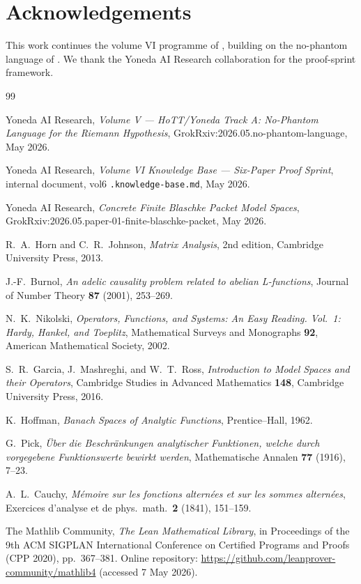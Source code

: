 \documentclass[12pt]{article}
\theoremstyle{definition}
\theoremstyle{remark}
\begin{document}
\section*{Acknowledgements}

This work continues the volume VI programme of \cite{Vol6KB}, building on
the no-phantom language of \cite{Vol5KB}. We thank the Yoneda AI Research
collaboration for the proof-sprint framework.

\begin{thebibliography}{99}

Yoneda AI Research, \emph{Volume V — HoTT/Yoneda Track A: No-Phantom Language for the Riemann Hypothesis}, GrokRxiv:2026.05.no-phantom-language, May 2026.

Yoneda AI Research, \emph{Volume VI Knowledge Base — Six-Paper Proof Sprint}, internal document, vol6 \texttt{.knowledge-base.md}, May 2026.

Yoneda AI Research, \emph{Concrete Finite Blaschke Packet Model Spaces}, GrokRxiv:2026.05.paper-01-finite-blaschke-packet, May 2026.

R.~A.~Horn and C.~R.~Johnson, \emph{Matrix Analysis}, 2nd edition, Cambridge University Press, 2013.

J.-F.~Burnol, \emph{An adelic causality problem related to abelian L-functions}, Journal of Number Theory \textbf{87} (2001), 253--269.

N.~K.~Nikolski, \emph{Operators, Functions, and Systems: An Easy Reading. Vol.~1: Hardy, Hankel, and Toeplitz}, Mathematical Surveys and Monographs \textbf{92}, American Mathematical Society, 2002.

S.~R.~Garcia, J.~Mashreghi, and W.~T.~Ross, \emph{Introduction to Model Spaces and their Operators}, Cambridge Studies in Advanced Mathematics \textbf{148}, Cambridge University Press, 2016.

K.~Hoffman, \emph{Banach Spaces of Analytic Functions}, Prentice--Hall, 1962.

G.~Pick, \emph{\"Uber die Beschr\"ankungen analytischer Funktionen, welche durch vorgegebene Funktionswerte bewirkt werden}, Mathematische Annalen \textbf{77} (1916), 7--23.

A.~L.~Cauchy, \emph{M\'emoire sur les fonctions altern\'ees et sur les sommes altern\'ees}, Exercices d'analyse et de phys.~math.~\textbf{2} (1841), 151--159.

The Mathlib Community, \emph{The Lean Mathematical Library}, in Proceedings of the 9th ACM SIGPLAN International Conference on Certified Programs and Proofs (CPP 2020), pp.~367--381. Online repository: \url{https://github.com/leanprover-community/mathlib4} (accessed 7 May 2026).

\end{thebibliography}
\end{document}
